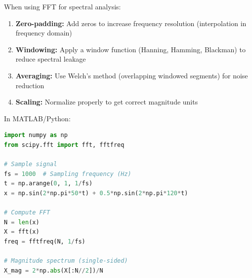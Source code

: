 \begin{practicalbox}[title=Using FFT in Practice]
When using FFT for spectral analysis:
\begin{enumerate}
    \item \textbf{Zero-padding:} Add zeros to increase frequency resolution (interpolation in frequency domain)
    \item \textbf{Windowing:} Apply a window function (Hanning, Hamming, Blackman) to reduce spectral leakage
    \item \textbf{Averaging:} Use Welch's method (overlapping windowed segments) for noise reduction
    \item \textbf{Scaling:} Normalize properly to get correct magnitude units
\end{enumerate}

In MATLAB/Python:
\begin{lstlisting}[language=Python]
import numpy as np
from scipy.fft import fft, fftfreq

# Sample signal
fs = 1000  # Sampling frequency (Hz)
t = np.arange(0, 1, 1/fs)
x = np.sin(2*np.pi*50*t) + 0.5*np.sin(2*np.pi*120*t)

# Compute FFT
N = len(x)
X = fft(x)
freq = fftfreq(N, 1/fs)

# Magnitude spectrum (single-sided)
X_mag = 2*np.abs(X[:N//2])/N
\end{lstlisting}
\end{practicalbox}

